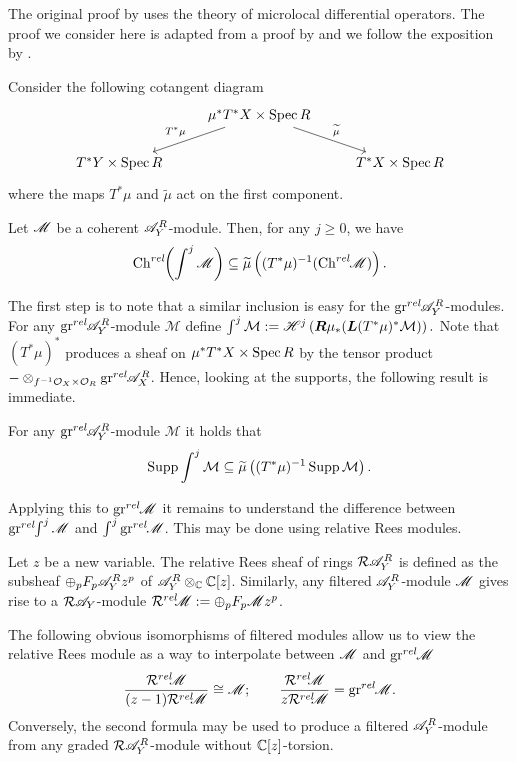 The original proof by \cite{kashiwara1976b} uses the theory of microlocal differential operators. The proof we consider here is adapted from a proof by \cite{malgrange1985images} and we follow the exposition by \cite{sabbah2011introduction}. %

Consider the following cotangent diagram
$$
\begin{tikzcd}
    & \mu^* T^* X\times \Spec R \arrow[swap]{ld}{T^* \mu} \arrow{rd}{\widetilde{\mu}} & \\
    T^* Y\times \Spec R & & T^*X\times \Spec R
\end{tikzcd}
$$
where the maps $T^*\mu$ and $\widetilde{\mu}$ act on the first component.
\begin{theorem}
    Let $\mathscr{M}$ be a coherent $\mathscr{A}_Y^R$-module. Then, for any $j\geq 0$, we have 
    $$\operatorname{Ch}^{rel}\mkern-5mu\left(\int^j \mathscr{M} \right)\subseteq  \widetilde{\mu}\left((T^*\mu)^{-1}(\operatorname{Ch}^{rel}\mkern-5mu \mathscr{M}) \right).$$
\end{theorem}
The first step is to note that a similar inclusion is easy for the $\operatorname{gr}^{rel}\mkern-5mu \mathscr{A}_Y^R$-modules. For any $\operatorname{gr}^{rel}\mkern-5mu \mathscr{A}_Y^R$-module $\mathcal{M}$ define $\int^j \mathcal{M} :=  \mathscr{H}^j\left(\boldsymbol{R} \mu_* (\boldsymbol{L}(T^*\mu)^* \mathcal{M})\right).$
Note that $(T^*\mu)^*$ produces a sheaf on $\mu^* T^* X \times \operatorname{Spec} R$ by the tensor product  ${-}\otimes_{f^{-1}\mathcal{O}_X\times \mathcal{O}_{R}} \operatorname{gr}^{rel}\mkern-5mu \mathscr{A}_X^R$. Hence, looking at the supports, the following result is immediate.
\begin{lemma}
    For any $\operatorname{gr}^{rel}\mkern-5mu\mathscr{A}_Y^R$-module $\mathcal{M}$ it holds that
    $$\operatorname{Supp} \int^j \mathcal{M}\subseteq \widetilde{\mu}\left((T^* \mu)^{-1} \operatorname{Supp} \mathcal{M}\right).$$
\end{lemma}
Applying this to $\operatorname{gr}^{rel}\mkern-5mu \mathscr{M}$ it remains to understand the difference between $\operatorname{gr}^{rel}\mkern-5mu\int^j \mathscr{M}$ and $\int^j \operatorname{gr}^{rel}\mkern-5mu \mathscr{M}$. This may be done using relative Rees modules.
\begin{definition}
    Let $z$ be a new variable. The relative Rees sheaf of rings $\mathcal{R}\mathscr{A}_Y^R$ is defined as the subsheaf $\oplus_p F_p \mathscr{A}_Y^R z^p $ of $\mathscr{A}_Y^R \otimes_{\mathbb{C}} \mathbb{C}[z]$. Similarly, any filtered $\mathscr{A}_Y^R$-module $\mathscr{M}$ gives rise to a $\mathcal{R}\mathscr{A}_Y$-module $\mathcal{R}^{rel}\mkern-5mu\mathscr{M} := \oplus_p F_p \mathscr{M} z^p$.
\end{definition}
The following obvious isomorphisms of filtered modules allow us to view the relative Rees module as a way to interpolate between $\mathscr{M}$ and $\operatorname{gr}^{rel}\mkern-5mu\mathscr{M}$
$$\frac{\mathcal{R}^{rel}\mkern-5mu\mathscr{M}}{(z-1)\mathcal{R}^{rel}\mkern-5mu\mathscr{M}} \cong \mathscr{M}; \qquad \frac{\mathcal{R}^{rel}\mkern-5mu\mathscr{M}}{z\mathcal{R}^{rel}\mkern-5mu\mathscr{M}} = \operatorname{gr}^{rel}\mkern-5mu \mathscr{M}.$$
Conversely, the second formula may be used to produce a filtered $\mathscr{A}_Y^R$-module from any graded $\mathcal{R}\mathscr{A}_Y^R$-module without $\mathbb{C}[z]$-torsion.

